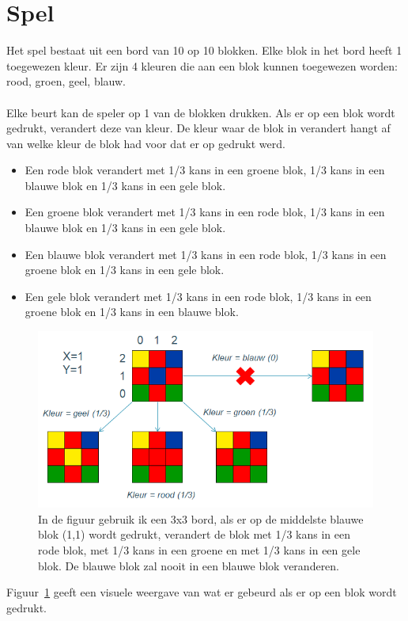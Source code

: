 \documentclass[12pt,a4paper,oneside]{book}
\begin{document}
\section{Spel}
Het spel bestaat uit een bord van 10 op 10 blokken. Elke blok in het bord heeft 1 toegewezen kleur. Er zijn 4 kleuren die aan een blok kunnen toegewezen worden: rood, groen, geel, blauw.\\\\
Elke beurt kan de speler op 1 van de blokken drukken. Als er op een blok wordt gedrukt, verandert deze van kleur. De kleur waar de blok in verandert hangt af van welke kleur de blok had voor dat er op gedrukt werd.
\begin{itemize}
  \item Een rode blok verandert met 1/3 kans in een groene blok, 1/3 kans in een blauwe blok en 1/3 kans in een gele blok.
  \item Een groene blok verandert met 1/3 kans in een rode blok, 1/3 kans in een blauwe blok en 1/3 kans in een gele blok.
  \item Een blauwe blok verandert met 1/3 kans in een rode blok, 1/3 kans in een groene blok en 1/3 kans in een gele blok.
  \item Een gele blok verandert met 1/3 kans in een rode blok, 1/3 kans in een groene blok en 1/3 kans in een blauwe blok.
\end{itemize}
\begin{figure}
  \centering
    \includegraphics[height=55truemm]{game_change_blocks}
  \caption{In de figuur gebruik ik een 3x3 bord, als er op de middelste blauwe blok (1,1) wordt gedrukt, verandert de blok met 1/3 kans in een rode blok, met 1/3 kans in een groene en met 1/3 kans in een gele blok. De blauwe blok zal nooit in een blauwe blok veranderen. }
  \label{fig:game_change_blocks}
\end{figure}
Figuur~\ref{fig:game_change_blocks} geeft een visuele weergave van wat er gebeurd als er op een blok wordt gedrukt.\\\\
\end{document}
